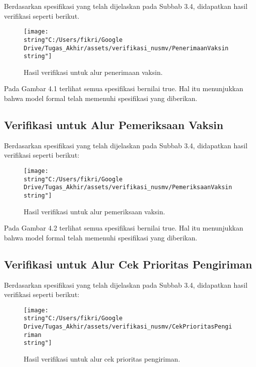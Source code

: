 Berdasarkan spesifikasi yang telah dijelaskan pada Subbab 3.4, didapatkan
hasil verifikasi seperti berikut.

\begin{figure}[H]
	\begin{centering}
		\texttt{[image: \\string"C:/Users/fikri/Google Drive/Tugas\_Akhir/assets/verifikasi\_nusmv/PenerimaanVaksin\\string"]}
		\par
	\end{centering}
	
	\caption{Hasil verifikasi untuk alur penerimaan vaksin.}
\end{figure}

Pada Gambar 4.1 terlihat semua spesifikasi bernilai true. Hal itu
menunjukkan bahwa model formal telah memenuhi spesifikasi yang diberikan.

\subsection{Verifikasi untuk Alur Pemeriksaan Vaksin}

Berdasarkan spesifikasi yang telah dijelaskan pada Subbab 3.4, didapatkan
hasil verifikasi seperti berikut:

\begin{figure}[H]
	\begin{centering}
		\texttt{[image: \\string"C:/Users/fikri/Google Drive/Tugas\_Akhir/assets/verifikasi\_nusmv/PemeriksaanVaksin\\string"]}
		\par
	\end{centering}
	
	\caption{Hasil verifikasi untuk alur pemeriksaan vaksin.}
	
\end{figure}

Pada Gambar 4.2 terlihat semua spesifikasi bernilai true. Hal itu
menunjukkan bahwa model formal telah memenuhi spesifikasi yang diberikan.

\subsection{Verifikasi untuk Alur Cek Prioritas Pengiriman}

Berdasarkan spesifikasi yang telah dijelaskan pada Subbab 3.4, didapatkan
hasil verifikasi seperti berikut:

\begin{figure}[H]
	\begin{centering}
		\texttt{[image: \\string"C:/Users/fikri/Google Drive/Tugas\_Akhir/assets/verifikasi\_nusmv/CekPrioritasPengiriman\\string"]}
		\par
	\end{centering}
	
	\caption{Hasil verifikasi untuk alur cek prioritas pengiriman.}
\end{figure}

